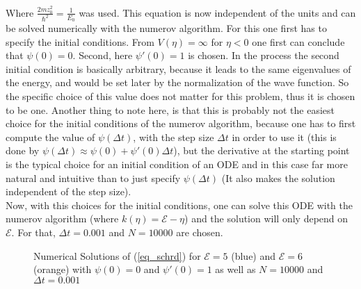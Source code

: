 \documentclass[12pt, a4paper]{article}
\begin{document}
  \noindent
  Where $\frac{2 m z_0^2}{\hbar^2} = \frac{1}{E_0}$ was used. This equation is now independent of the units and can be solved numerically with the numerov algorithm. For this one first has to specify the initial conditions. From $V(\eta) = \infty$ for $\eta < 0$ one first can conclude that $\psi(0) = 0$. Second, here $\psi'(0) = 1$ is chosen. In the process the second initial condition is basically arbitrary, because it leads to the same eigenvalues of the energy, and would be set later by the normalization of the wave function. So the specific choice of this value does not matter for this problem, thus it is chosen to be one. Another thing to note here, is that this is probably not the easiest choice for the initial conditions of the numerov algorithm, because one has to first compute the value of $\psi(\Delta t)$, with the step size $\Delta t$ in order to use it (this is done by $\psi(\Delta t) \approx \psi(0) + \psi'(0) \Delta t$), but the derivative at the starting point is the typical choice for an initial condition of an ODE and in this case far more natural and intuitive than to just specify $\psi(\Delta t)$ (It also makes the solution independent of the step size).\\
  Now, with this choices for the initial conditions, one can solve this ODE with the numerov algorithm (where $k(\eta) = \mathcal{E} - \eta$) and the solution will only depend on $\mathcal{E}$. For that, $\Delta t = 0.001$ and $N = 10000$ are chosen. \\

  \begin{figure}[ht]
    
    \caption{Numerical Solutions of (\ref{eq_schrd}) for $\mathcal{E} = 5$ (blue) and $\mathcal{E} = 6$ (orange) with $\psi(0) = 0$ and $\psi'(0) = 1$ as well as $N = 10000$ and $\Delta t = 0.001$}
    \label{fig_ex_sols}
  \end{figure}
\end{document}
